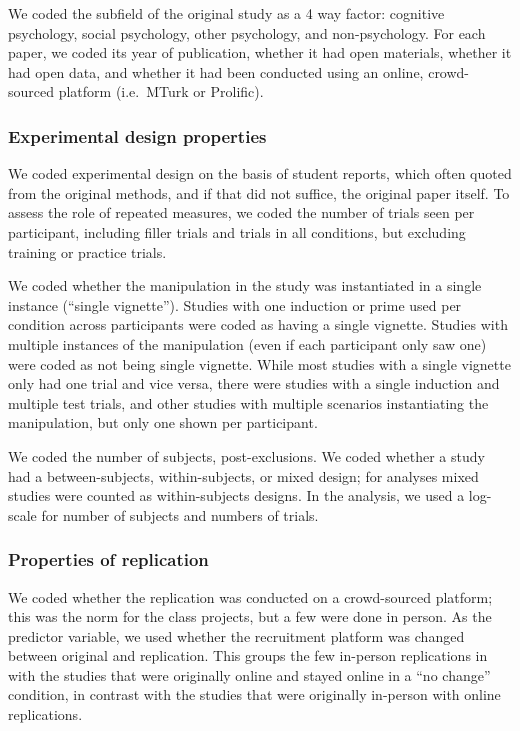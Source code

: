 \documentclass[
  english,
  a4paper,
]{article}
\begin{document}
We coded the subfield of the original study as a 4 way factor: cognitive psychology, social psychology, other psychology, and non-psychology. For each paper, we coded its year of publication, whether it had open materials, whether it had open data, and whether it had been conducted using an online, crowd-sourced platform (i.e.~MTurk or Prolific).

\hypertarget{experimental-design-properties}{%
\subsubsection{Experimental design properties}\label{experimental-design-properties}}

We coded experimental design on the basis of student reports, which often quoted from the original methods, and if that did not suffice, the original paper itself. To assess the role of repeated measures, we coded the number of trials seen per participant, including filler trials and trials in all conditions, but excluding training or practice trials.

We coded whether the manipulation in the study was instantiated in a single instance (``single vignette''). Studies with one induction or prime used per condition across participants were coded as having a single vignette. Studies with multiple instances of the manipulation (even if each participant only saw one) were coded as not being single vignette. While most studies with a single vignette only had one trial and vice versa, there were studies with a single induction and multiple test trials, and other studies with multiple scenarios instantiating the manipulation, but only one shown per participant.

We coded the number of subjects, post-exclusions. We coded whether a study had a between-subjects, within-subjects, or mixed design; for analyses mixed studies were counted as within-subjects designs. In the analysis, we used a log-scale for number of subjects and numbers of trials.

\hypertarget{properties-of-replication}{%
\subsubsection{Properties of replication}\label{properties-of-replication}}

We coded whether the replication was conducted on a crowd-sourced platform; this was the norm for the class projects, but a few were done in person. As the predictor variable, we used whether the recruitment platform was changed between original and replication. This groups the few in-person replications in with the studies that were originally online and stayed online in a ``no change'' condition, in contrast with the studies that were originally in-person with online replications.
\end{document}
